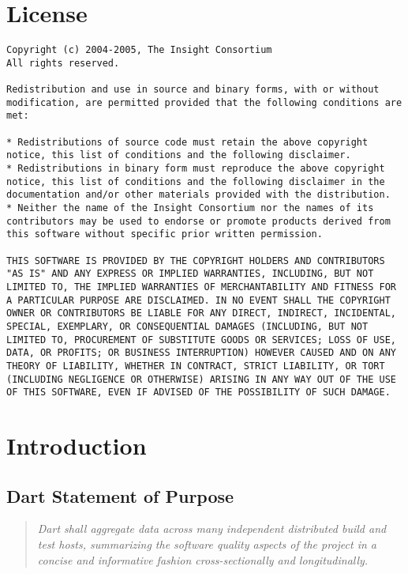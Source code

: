 \documentclass{InsightBook}
\begin{document}
\chapter*{License}
\begin{verbatim}
Copyright (c) 2004-2005, The Insight Consortium
All rights reserved.

Redistribution and use in source and binary forms, with or without
modification, are permitted provided that the following conditions are
met:

* Redistributions of source code must retain the above copyright
notice, this list of conditions and the following disclaimer.
* Redistributions in binary form must reproduce the above copyright
notice, this list of conditions and the following disclaimer in the
documentation and/or other materials provided with the distribution.
* Neither the name of the Insight Consortium nor the names of its
contributors may be used to endorse or promote products derived from
this software without specific prior written permission.

THIS SOFTWARE IS PROVIDED BY THE COPYRIGHT HOLDERS AND CONTRIBUTORS
"AS IS" AND ANY EXPRESS OR IMPLIED WARRANTIES, INCLUDING, BUT NOT
LIMITED TO, THE IMPLIED WARRANTIES OF MERCHANTABILITY AND FITNESS FOR
A PARTICULAR PURPOSE ARE DISCLAIMED. IN NO EVENT SHALL THE COPYRIGHT
OWNER OR CONTRIBUTORS BE LIABLE FOR ANY DIRECT, INDIRECT, INCIDENTAL,
SPECIAL, EXEMPLARY, OR CONSEQUENTIAL DAMAGES (INCLUDING, BUT NOT
LIMITED TO, PROCUREMENT OF SUBSTITUTE GOODS OR SERVICES; LOSS OF USE,
DATA, OR PROFITS; OR BUSINESS INTERRUPTION) HOWEVER CAUSED AND ON ANY
THEORY OF LIABILITY, WHETHER IN CONTRACT, STRICT LIABILITY, OR TORT
(INCLUDING NEGLIGENCE OR OTHERWISE) ARISING IN ANY WAY OUT OF THE USE
OF THIS SOFTWARE, EVEN IF ADVISED OF THE POSSIBILITY OF SUCH DAMAGE.
\end{verbatim}


\chapter{Introduction}

\section{Dart Statement of Purpose}
\begin{quote}
\emph{Dart shall aggregate data across many independent distributed
build and test hosts, summarizing the software quality aspects of the project
in a concise and informative fashion cross-sectionally and longitudinally.}
\end{quote}
\end{document}
